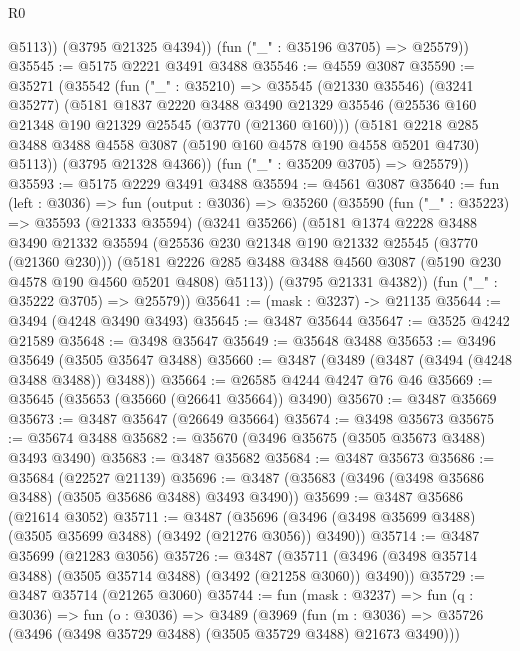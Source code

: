 \begin{lexlean}{R0}
\begin{coremodule}
            @5113))
        (@3795 @21325 @4394))
      (fun ("_" : @35196 @3705) => @25579))
@35545 := @5175 @2221 @3491 @3488
@35546 := @4559 @3087
@35590 := @35271
    (@35542
      (fun ("_" : @35210) =>
      @35545
        (@21330 @35546)
        (@3241 @35277)
        (@5181
          @1837
          @2220
          @3488
          @3490
          @21329
          @35546
          (@25536 @160 @21348 @190 @21329 @25545 (@3770 (@21360 @160)))
          (@5181
            @2218
            @285
            @3488
            @3488
            @4558
            @3087
            (@5190 @160 @4578 @190 @4558 @5201 @4730)
            @5113))
        (@3795 @21328 @4366))
      (fun ("_" : @35209 @3705) => @25579))
@35593 := @5175 @2229 @3491 @3488
@35594 := @4561 @3087
@35640 := fun (left : @3036) =>
  fun (output : @3036) =>
  @35260
    (@35590
      (fun ("_" : @35223) =>
      @35593
        (@21333 @35594)
        (@3241 @35266)
        (@5181
          @1374
          @2228
          @3488
          @3490
          @21332
          @35594
          (@25536 @230 @21348 @190 @21332 @25545 (@3770 (@21360 @230)))
          (@5181
            @2226
            @285
            @3488
            @3488
            @4560
            @3087
            (@5190 @230 @4578 @190 @4560 @5201 @4808)
            @5113))
        (@3795 @21331 @4382))
      (fun ("_" : @35222 @3705) => @25579))
@35641 := (mask : @3237) -> @21135
@35644 := @3494 (@4248 @3490 @3493)
@35645 := @3487 @35644
@35647 := @3525 @4242 @21589
@35648 := @3498 @35647
@35649 := @35648 @3488
@35653 := @3496 @35649 (@3505 @35647 @3488)
@35660 := @3487 (@3489 (@3487 (@3494 (@4248 @3488 @3488)) @3488))
@35664 := @26585 @4244 @4247 @76 @46
@35669 := @35645 (@35653 (@35660 (@26641 @35664)) @3490)
@35670 := @3487 @35669
@35673 := @3487 @35647 (@26649 @35664)
@35674 := @3498 @35673
@35675 := @35674 @3488
@35682 := @35670 (@3496 @35675 (@3505 @35673 @3488) @3493 @3490)
@35683 := @3487 @35682
@35684 := @3487 @35673
@35686 := @35684 (@22527 @21139)
@35696 := @3487 (@35683 (@3496 (@3498 @35686 @3488) (@3505 @35686 @3488) @3493 @3490))
@35699 := @3487 @35686 (@21614 @3052)
@35711 := @3487
    (@35696 (@3496 (@3498 @35699 @3488) (@3505 @35699 @3488) (@3492 (@21276 @3056)) @3490))
@35714 := @3487 @35699 (@21283 @3056)
@35726 := @3487
    (@35711 (@3496 (@3498 @35714 @3488) (@3505 @35714 @3488) (@3492 (@21258 @3060)) @3490))
@35729 := @3487 @35714 (@21265 @3060)
@35744 := fun (mask : @3237) =>
  fun (q : @3036) =>
  fun (o : @3036) =>
  @3489
    (@3969
      (fun (m : @3036) => @35726 (@3496 (@3498 @35729 @3488) (@3505 @35729 @3488) @21673 @3490)))

\end{coremodule}
\end{lexlean}
